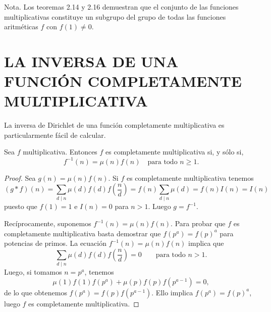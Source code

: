 \documentclass[12pt,a4paper]{book}
\begin{document}
    Nota. Los teoremas 2.14 y 2.16 demuestran que el conjunto de las funciones
    multiplicativas constituye un subgrupo del grupo de todas las funciones aritméticas $f$
    con $f(1)\neq0$.

    \section{LA INVERSA DE UNA FUNCIÓN COMPLETAMENTE MULTIPLICATIVA}

    La inversa de Dirichlet de una función completamente multiplicativa es
    particularmente fácil de calcular.

    \begin{teorema}
        Sea $f$ multiplicativa. Entonces $f$ es completamente multiplicativa si, y sólo
        si,
        \begin{equation*}
            f^{-1}(n)=\mu(n)f(n)\quad\text{para todo } n\geq1.
        \end{equation*}
    \end{teorema}

    \begin{proof}
        Sea $g(n)=\mu(n)f(n)$. Si $f$ es completamente multiplicativa tenemos
        \begin{equation*}
            (g*f)(n)=\sum_{d\mid n}\mu(d)f(d)f\left(\frac{n}{d}\right)
            =f(n)\sum_{d\mid n}\mu(d)=f(n)I(n)=I(n)
        \end{equation*}
        puesto que $f(1)=1$ e $I(n)=0$ para $n>1$. Luego $g=f^{-1}$.

        Recíprocamente, suponemos $f^{-1}(n)=\mu(n)f(n)$. Para probar que $f$ es
        completamente multiplicativa basta demostrar que $f(p^a)=f(p)^a$ para potencias de
        primos. La ecuación $f^{-1}(n)=\mu(n)f(n)$ implica que
        \begin{equation*}
            \sum_{d\mid n}\mu(d)f(d)f\left(\frac{n}{d}\right)=0\qquad\text{para todo } n>1.
        \end{equation*}
        Luego, si tomamos $n=p^a$, tenemos
        \begin{equation*}
            \mu(1)f(1)f(p^a)+\mu(p)f(p)f(p^{a-1})=0,
        \end{equation*}
        de lo que obtenemos $f(p^a)=f(p)f(p^{a-1})$. Ello implica $f(p^a)=f(p)^a$, luego $f$
        es completamente multiplicativa.
    \end{proof}
\end{document}

